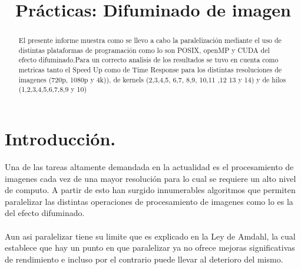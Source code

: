 \documentclass{IEEEtran}
\begin{document}
%
\title{Prácticas: Difuminado de imagen}


\author{
}


\maketitle

\nonstopmode

\tableofcontents 
\hfill


\begin{abstract}
El presente informe muestra como se llevo a cabo la paralelización  mediante el uso de distintas plataformas de programación como lo son  POSIX, openMP y CUDA   del efecto difuminado.Para un correcto analisis de los resultados se tuvo en cuenta como metricas tanto el Speed Up como de Time Response para los distintas resoluciones  de imagenes (720p, 1080p y 4k)), de kernels (2,3,4,5, 6,7, 8,9, 10,11 ,12 13 y 14) y de hilos (1,2,3,4,5,6,7,8,9 y 10)

\end{abstract}



\IEEEpeerreviewmaketitle



\section{Introducción.}
Una de las tareas altamente demandada en la actualidad es el procesamiento de imagenes cada vez de una mayor resolución para lo cual se requiere un alto nivel de computo. A partir de esto han surgido innumerables algoritmos que permiten paralelizar las distintas operaciones de procesamiento de imagenes como lo es la del efecto difuminado.\\\\
Aun asi paralelizar tiene su limite que es explicado en la Ley de Amdahl, la cual establece que hay un punto en que paralelizar ya no ofrece mejoras significativas de rendimiento e incluso por el contrario puede llevar al deterioro del mismo.\\\\
\end{document}
